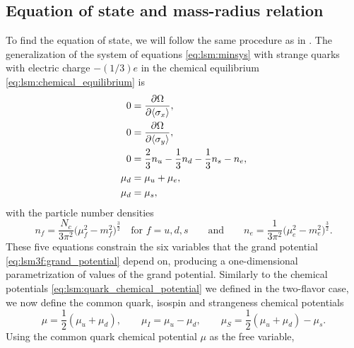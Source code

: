 

\subsection{Equation of state and mass-radius relation}


To find the equation of state,
we will follow the same procedure as in .
The generalization of the system of equations \eqref{eq:lsm:minsys} with strange quarks with electric charge $-(1/3)e$ in the chemical equilibrium \eqref{eq:lsm:chemical_equilibrium} is
\begin{subequations}
\begin{align}
	0 &= \pdv{\Omega}{ \langle \sigma_x \rangle}, \\
	0 &= \pdv{\Omega}{ \langle \sigma_y \rangle}, \\
	0 &= \frac23 n_u - \frac13 n_d - \frac13 n_s - n_e, \\
	\mu_d &= \mu_u + \mu_e, \\
	\mu_d &= \mu_s,
\end{align}%
\label{eq:lsm3f:minsys}%
\end{subequations}%
with the particle number densities
\begin{equation}
	n_f = \frac{N_c}{3\pi^2} \Big(\mu_f^2 - m_f^2\Big)^{\frac32} \quad \text{for $f = u,d,s$}
	\qquad \text{and} \qquad
	n_e = \frac{  1}{3\pi^2} \Big(\mu_e^2 - m_e^2\Big)^{\frac32}.
\label{eq:lsm3f:particle_densities}
\end{equation}
These five equations constrain the six variables that the grand potential \eqref{eq:lsm3f:grand_potential} depend on,
producing a one-dimensional parametrization of values of the grand potential.
Similarly to the chemical potentials \eqref{eq:lsm:quark_chemical_potential} we defined in the two-flavor case,
we now define the common quark, isospin and strangeness chemical potentials
\begin{equation}
	\mu = \frac12 (\mu_u + \mu_d), \qquad
	\mu_I = \mu_u - \mu_d, \qquad
	\mu_S = \frac12 (\mu_u + \mu_d) - \mu_s.
\end{equation}
Using the common quark chemical potential $\mu$ as the free variable,
